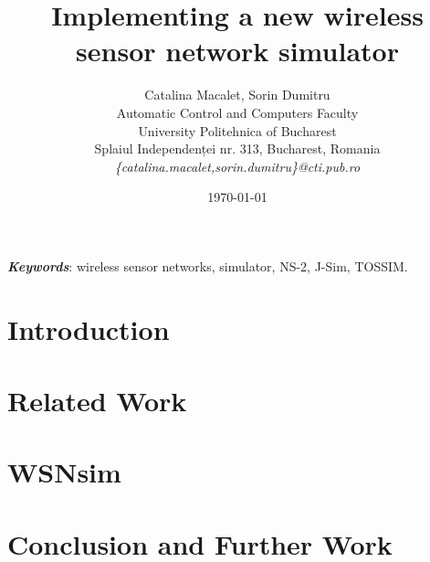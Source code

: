 \documentclass[12pt]{article}
\title{Implementing a new wireless sensor network simulator}
\author{Catalina Macalet, Sorin Dumitru\\
Automatic Control and Computers Faculty\\
University Politehnica of Bucharest\\
Splaiul Independenței nr. 313, Bucharest, Romania \\
\emph{\{catalina.macalet,sorin.dumitru\}@cti.pub.ro}}
\date{\today}
\newcommand{\codename}{WSNsim }
\begin{document}
\nocite{*}
\maketitle

\begin{abstract}

\end{abstract}

\textit{\textbf{Keywords}}: wireless sensor networks, simulator, NS-2, J-Sim, TOSSIM.

\section{Introduction}
\label{sec:introduction}


\section{Related Work}
\label{sec:relatedwork}


\section{\codename}
\label{sec:simulator}


\section{Conclusion and Further Work}
\label{sec:conclusion}

\newpage


\end{document}
